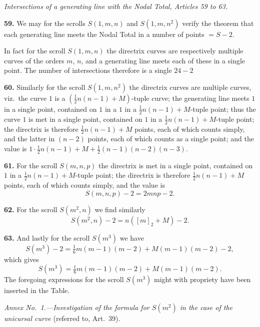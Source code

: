\documentclass[11pt,a4paper]{article}
\begin{document}
\medskip

\noindent \textit{Intersections of a generating line with the Nodal Total, Articles 59 to 63.}

\medskip

\textbf{59.} We may for the scrolls $S(1, m, n)$ and $S(1, m, n^2)$ verify the theorem that each generating line meets the Nodal Total in a number of points $= S - 2$.

\medskip

\noindent In fact for the scroll $S(1, m, n)$ the directrix curves are respectively multiple curves of the orders $m$, $n$, and a generating line meets each of these in a single point. The number of intersections therefore is a single $24-2$

\medskip

\textbf{60.} Similarly for the scroll $S(1, m, n^2)$ the directrix curves are multiple curves, viz.\ the curve $1$ is a $(\frac{1}{2}n(n-1) + M)$-tuple curve; the generating line meets $1$ in a single point, contained on $1$ in a $1$ in a $\frac{1}{2}n(n-1) + M$-tuple point; thus the curve $1$ is met in a single point, contained on $1$ in a $\frac{1}{2}n(n-1) + M$-tuple point; the directrix is therefore $\frac{1}{2}n(n-1) + M$ points, each of which counts simply, and the latter in $(n-2)$ points, each of which counts as a single point; and the value is $1 \cdot \frac{1}{2}n(n-1) + M + \frac{1}{2}(n-1)(n-2)(n-3)$.

\medskip

\textbf{61.} For the scroll $S(m, n, p)$ the directrix is met in a single point, contained on $1$ in a $\frac{1}{2}n(n-1) + M$-tuple point; the directrix is therefore $\frac{1}{2}n(n-1) + M$ points, each of which counts simply, and the value is
\[
S(m, n, p) - 2 = 2mnp - 2.
\]

\medskip

\textbf{62.} For the scroll $S(m^2, n)$ we find similarly
\[
S(m^2, n) - 2 = n([m]_2 + M) - 2.
\]

\medskip

\textbf{63.} And lastly for the scroll $S(m^3)$ we have
\[
S(m^3) - 2 = \tfrac{1}{6}m(m - 1)(m - 2) + M(m-1)(m-2) - 2,
\]
which gives
\[
S(m^3) = \tfrac{1}{6}m(m-1)(m-2) + M(m-1)(m-2).
\]
The foregoing expressions for the scroll $S(m^3)$ might with propriety have been inserted in the Table.

\medskip

\noindent \textit{Annex No.\ 1.---Investigation of the formula for $S(m^2)$ in the case of the unicursal curve} (referred to, Art.\ 39).
\end{document}
